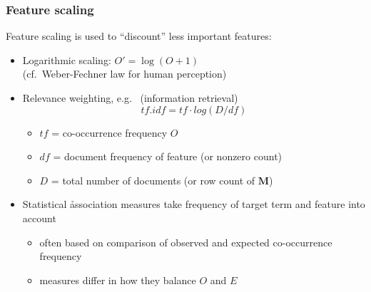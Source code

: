 \documentclass[t]{beamer} %
\begin{document}

\begin{frame}
  \frametitle{Feature scaling}

  Feature scaling is used to ``discount'' less important features:
  \begin{itemize}
  \item<1-> Logarithmic scaling: $O' = \log (O + 1)$\\
    (cf.\ Weber-Fechner law for human perception)
  \item<2-> Relevance weighting, e.g.\  (information retrieval)
    \[
    tf.idf = tf \cdot log(D / df)
    \]
    \ungap[1.5]
    \begin{itemize}
    \item $tf$ = co-occurrence frequency $O$
    \item $df$ = document frequency of feature (or nonzero count)
    \item $D$ = total number of documents (or row count of $\mathbf{M}$)
    \end{itemize}
  \item<3-> Statistical \h{association measures} \citep{Evert:04phd,Evert:08}
    take frequency of target term and feature into account
    \begin{itemize}
    \item often based on comparison of observed and expected co-occurrence frequency
    \item measures differ in how they balance $O$ and $E$
    \end{itemize}
  \end{itemize}
\end{frame}
\end{document}
